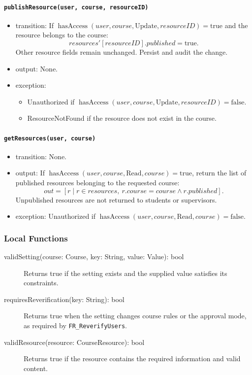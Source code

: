\documentclass[12pt, titlepage]{article}
\begin{document}
\paragraph{\texttt{publishResource(user, course, resourceID)}}
\begin{itemize}
    \item transition: If $\operatorname{hasAccess}(user,course,\text{Update},resourceID)=\text{true}$ and the resource belongs to the course:
    \[
    \mathit{resources}'[resourceID].published
    =\text{true}.
    \]
    Other resource fields remain unchanged. Persist and audit the change.

    \item output: None.

    \item exception:
    \begin{itemize}
        \item Unauthorized if $\operatorname{hasAccess}(user,course,\text{Update},resourceID)=\text{false}$.
        \item ResourceNotFound if the resource does not exist in the course.
    \end{itemize}
\end{itemize}

\paragraph{\texttt{getResources(user, course)}}
\begin{itemize}
    \item transition: None.

    \item output: If $\operatorname{hasAccess}(user,course,\text{Read},course)=\text{true}$, return the list of published resources belonging to the requested course:
    \[
    out=[r\mid r\in\mathit{resources},
    \ r.course=course\land r.published].
    \]
    Unpublished resources are not returned to students or supervisors.

    \item exception: Unauthorized if $\operatorname{hasAccess}(user,course,\text{Read},course)=\text{false}$.
\end{itemize}

\subsubsection{Local Functions}

\begin{description}
    \item[validSetting(course: Course, key: String, value: Value): bool] Returns true if the setting exists and the supplied value satisfies its constraints.
    \item[requiresReverification(key: String): bool] Returns true when the setting changes course rules or the approval mode, as required by \texttt{FR\_ReverifyUsers}.

    \item[validResource(resource: CourseResource): bool] Returns true if the resource contains the required information and valid content.
\end{description}
\end{document}
